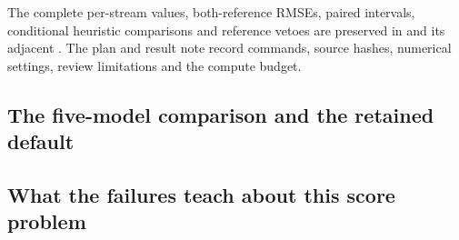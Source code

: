 The complete per-stream values, both-reference RMSEs, paired intervals,
conditional heuristic comparisons and reference vetoes are preserved in
and its adjacent . The plan and result note record commands,
source hashes, numerical settings, review limitations and the compute budget.

\subsection{The five-model comparison and the retained default}
\label{sec:parent-cross-model-findings}


\subsection{What the failures teach about this score problem}
\label{sec:parent-failure-mechanisms}

